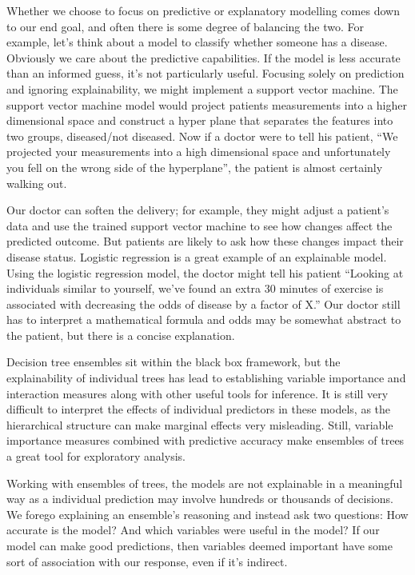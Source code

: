 \documentclass[
  12pt,
  letterpaper,
  DIV=11,
  numbers=noendperiod]{scrartcl}
\begin{document}
Whether we choose to focus on predictive or explanatory modelling comes
down to our end goal, and often there is some degree of balancing the
two. For example, let's think about a model to classify whether someone
has a disease. Obviously we care about the predictive capabilities. If
the model is less accurate than an informed guess, it's not particularly
useful. Focusing solely on prediction and ignoring explainability, we
might implement a support vector machine. The support vector machine
model would project patients measurements into a higher dimensional
space and construct a hyper plane that separates the features into two
groups, diseased/not diseased. Now if a doctor were to tell his patient,
``We projected your measurements into a high dimensional space and
unfortunately you fell on the wrong side of the hyperplane'', the
patient is almost certainly walking out.

Our doctor can soften the delivery; for example, they might adjust a
patient's data and use the trained support vector machine to see how
changes affect the predicted outcome. But patients are likely to ask how
these changes impact their disease status. Logistic regression is a
great example of an explainable model. Using the logistic regression
model, the doctor might tell his patient ``Looking at individuals
similar to yourself, we've found an extra 30 minutes of exercise is
associated with decreasing the odds of disease by a factor of X.'' Our
doctor still has to interpret a mathematical formula and odds may be
somewhat abstract to the patient, but there is a concise explanation.

Decision tree ensembles sit within the black box framework, but the
explainability of individual trees has lead to establishing variable
importance and interaction measures along with other useful tools for
inference. It is still very difficult to interpret the effects of
individual predictors in these models, as the hierarchical structure can
make marginal effects very misleading. Still, variable importance
measures combined with predictive accuracy make ensembles of trees a
great tool for exploratory analysis.

Working with ensembles of trees, the models are not explainable in a
meaningful way as a individual prediction may involve hundreds or
thousands of decisions. We forego explaining an ensemble's reasoning and
instead ask two questions: How accurate is the model? And which
variables were useful in the model? If our model can make good
predictions, then variables deemed important have some sort of
association with our response, even if it's indirect.
\end{document}
